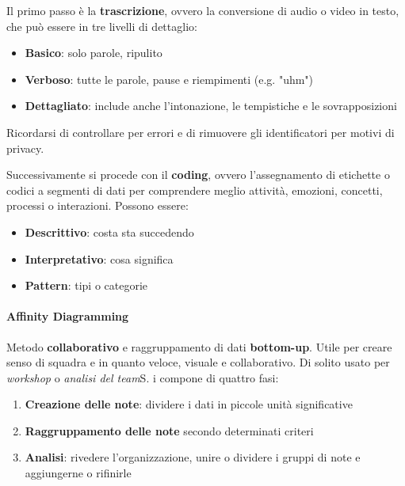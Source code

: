 Il primo passo è la \textbf{trascrizione}, ovvero la conversione di audio o video in testo, che può essere in tre livelli di dettaglio:
\begin{itemize}
	\item \textbf{Basico}: solo parole, ripulito
	\item \textbf{Verboso}: tutte le parole, pause e riempimenti (e.g. "uhm")
	\item \textbf{Dettagliato}: include anche l'intonazione, le tempistiche e le sovrapposizioni
\end{itemize}

\begin{note}
	Ricordarsi di controllare per errori e di rimuovere gli identificatori per motivi di privacy.
\end{note}

Successivamente si procede con il \textbf{coding}, ovvero l'assegnamento di etichette o codici a segmenti di dati per comprendere meglio attività, emozioni, concetti, processi o interazioni. Possono essere:
\begin{itemize}
	\item \textbf{Descrittivo}: costa sta succedendo
	\item \textbf{Interpretativo}: cosa significa
	\item \textbf{Pattern}: tipi o categorie
\end{itemize}

\paragraph{Affinity Diagramming} Metodo \textbf{collaborativo} e raggruppamento di dati \textbf{bottom-up}. Utile per creare senso di squadra e in quanto veloce, visuale e collaborativo. Di solito usato per \textit{workshop} o \textit{analisi del team}S. i compone di quattro fasi:
\begin{enumerate}
	\item \textbf{Creazione delle note}: dividere i dati in piccole unità significative
	\item \textbf{Raggruppamento delle note} secondo determinati criteri
	\item \textbf{Analisi}: rivedere l'organizzazione, unire o dividere i gruppi di note e aggiungerne o rifinirle
\end{enumerate}

